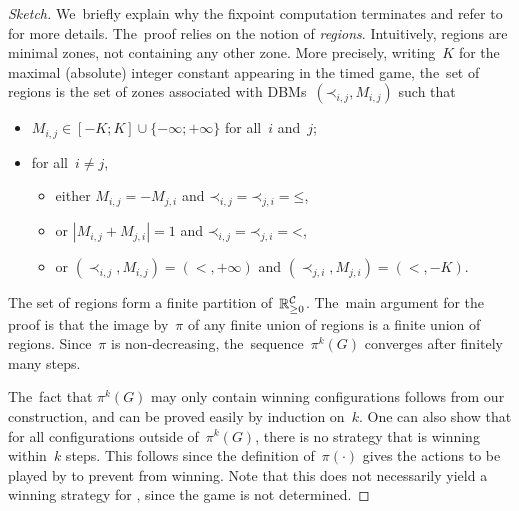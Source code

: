 \begin{proof}[Sketch]
  We~briefly explain why the fixpoint computation terminates and refer
  to~\cite{AMPS98,CDFLL05} for more details.  The~proof relies on the notion of
  \emph{regions}. Intuitively, regions are minimal zones, not
  containing any other zone. More precisely, writing~$K$ for the maximal
  (absolute) integer constant appearing in the timed game, the~set of regions is
  the set of zones associated with
  DBMs~$(\mathord\prec_{i,j},M_{i,j})$ such that
  \begin{itemize}
  \item $M_{i,j}\in [-K; K]\cup\{-\infty;+\infty\}$ for all~$i$ and~$j$;
  \item for all~$i\not=j$,
     \begin{itemize}
    \item either $M_{i,j}=-M_{j,i}$ and
      $\mathord\prec_{i,j}=\mathord\prec_{j,i}=\mathord\leq$,
     \item or $|M_{i,j}+M_{j,i}|=1$ and 
      $\mathord\prec_{i,j}=\mathord\prec_{j,i}=\mathord<$,
    \item or $(\prec_{i,j},M_{i,j})=(<,+\infty)$ and $(\prec_{j,i},M_{j,i})=(<,-K)$.
     \end{itemize}
  \end{itemize}
  The set of regions form a finite partition of~$\mathbb{R}_{\geq 0}^{\mathcal{C}}$.
  The~main argument for the proof is that the
  image by~$\pi$ of any finite union of regions is a finite union of
  regions. Since~$\pi$ is non-decreasing, the~sequence~$\pi^k(G)$
  converges after finitely many steps.

  The~fact that $\pi^k(G)$ may
  only contain winning configurations follows from our construction,
  and can be proved easily by induction on~$k$.
  One can also show that for all configurations outside of~$\pi^k(G)$,
  there is no strategy that is winning within~$k$ steps. This follows since
  the definition of~$\pi(\cdot)$ gives the actions to be played by \Adam to
  prevent \Eve from winning.
  Note that this does not necessarily yield a winning strategy for \Adam,
  since the game is not determined.
\end{proof}




